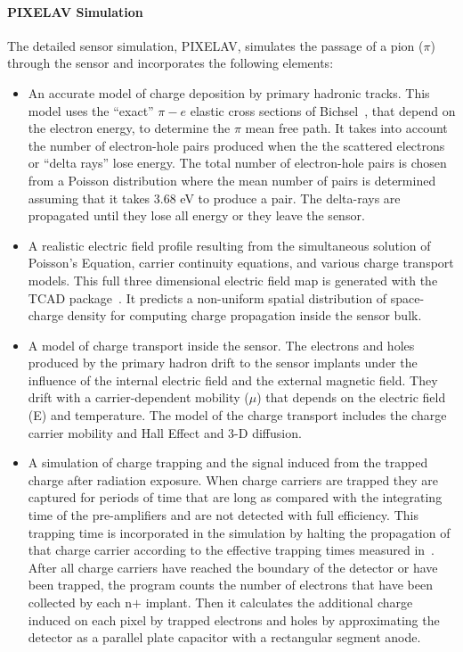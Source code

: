 \paragraph{PIXELAV Simulation}

The detailed sensor simulation, PIXELAV, simulates the passage of a pion ($\pi$) through the sensor and incorporates the following elements:
\begin{itemize}
    \item An accurate model of charge deposition by primary hadronic tracks. This model uses the ``exact'' $\pi-e$ elastic cross sections of Bichsel~\cite{bischel}, that depend on the electron energy, to determine the $\pi$ mean free path.
    It takes into account the number of electron-hole pairs produced when the the scattered electrons or ``delta rays''  lose energy. 
    The total number of electron-hole pairs is chosen from a Poisson distribution where the mean number of pairs is determined assuming that it takes 3.68 eV to produce a pair. 
    The delta-rays are propagated until they lose all energy or they leave the sensor.
    \item A realistic electric field profile resulting from the simultaneous solution of Poisson’s Equation, carrier continuity equations, and various charge transport models. This full three dimensional electric field map is generated with the  TCAD package~\cite{tcad}.
    It predicts a non-uniform spatial distribution of space-charge density for computing charge propagation inside the sensor bulk.
    \item A model of charge transport inside the sensor. 
    The electrons and holes produced by the primary hadron drift to the sensor implants under the influence of the internal electric field and the external magnetic field.
    They drift with a carrier-dependent mobility ($\mu$) that depends on the electric field (E) and temperature.
    The model of the charge transport includes the charge carrier mobility and Hall Effect and 3-D diffusion.
    \item A simulation of charge trapping and the signal induced from the trapped charge after radiation exposure. 
    When charge carriers are trapped they  are captured for periods of time that are long as compared with the integrating time of the pre-amplifiers and are not detected with full efficiency.
    This trapping time is incorporated in the simulation by halting the propagation of that charge carrier according to the effective trapping times measured in~\cite{kram}.
    After all charge carriers have reached the boundary of the detector or have been trapped, the program counts the number of electrons that have been collected by each n$+$ implant.
    Then it calculates the additional charge induced on each pixel by trapped electrons and holes by approximating the detector as a parallel plate capacitor with a rectangular segment anode.
\end{itemize}

